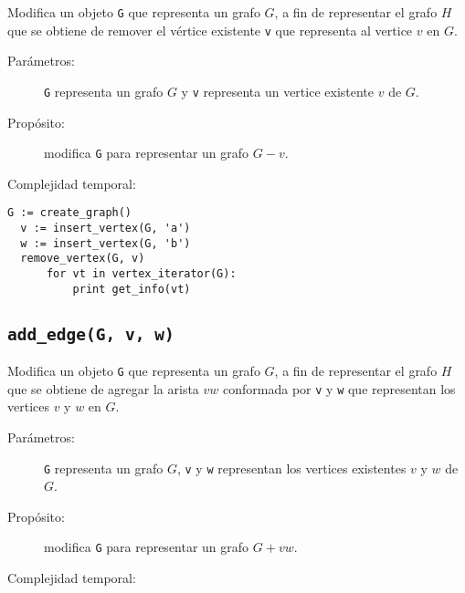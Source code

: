 \documentclass[a4paper,12pt]{article}
\makeatletter
\newcommand{\Code}[1]{\lstinline[basicstyle={\tt}]@#1@}
\makeatother
\begin{document}
Modifica un objeto \Code{G} que representa un grafo $G$, a fin de representar el grafo $H$ que se obtiene de remover el vértice existente \Code{v} que representa al vertice $v$ en $G$.
  
\begin{description}
  \item [Parámetros:] \Code{G} representa un grafo $G$ y \Code{v} representa un vertice existente $v$ de $G$.
  \item [Propósito:] modifica \Code{G} para representar un grafo $G - v$.
  \item [Complejidad temporal:]
\end{description}


\begin{lstlisting}[caption={Ejemplo de uso de remove\_vertex. El código crea un grafo $G$ con dos vértices, el primero \texttt{v} representa al vértice $v$ con la letra 'a' y el segundo \texttt{w} representa al vértice $w$ con la letra 'b' como infomación. Luego, remueve \texttt{v} del grafo y el ciclo imprime ``b'' como resultado. Ver Sección~\ref{sec:tad grafo:vertex-iterator} para más información de \texttt{vertex\_iterator}.},gobble=2,float=ht,label={lst:pseudo:remove_vertex},emph={remove_vertex}]
  G := create_graph()
  v := insert_vertex(G, 'a')
  w := insert_vertex(G, 'b')
  remove_vertex(G, v)
      for vt in vertex_iterator(G):
          print get_info(vt)
\end{lstlisting}


\subsection{\texttt{add\_edge(G, v, w)}}
\label{sec:tad grafo:add-edge}

Modifica un objeto \Code{G} que representa un grafo $G$, a fin de representar el grafo $H$ que se obtiene de agregar la arista $vw$ conformada por \Code{v} y \Code{w} que representan los vertices $v$ y $w$ en $G$.

\begin{description}
  \item [Parámetros:] \Code{G} representa un grafo $G$, \Code{v} y \Code{w} representan los vertices existentes $v$ y $w$ de $G$.
  \item [Propósito:] modifica \Code{G} para representar un grafo $G + vw$.
  \item [Complejidad temporal:]
\end{description}
\end{document}

